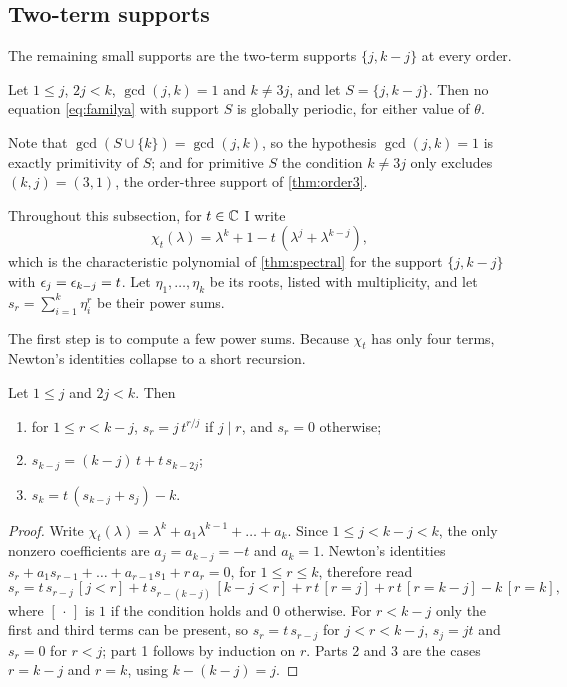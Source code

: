 \subsection{Two-term supports}

The remaining small supports are the two-term supports $\{j,k-j\}$ at
every order.

\begin{theorem}
\label{thm:twoterm}
Let $1\le j$, $2j<k$, $\gcd(j,k)=1$ and $k\ne3j$, and let $S=\{j,k-j\}$.
Then no equation \eqref{eq:familya} with support $S$ is globally periodic,
for either value of $\theta$.
\end{theorem}

Note that $\gcd(S\cup\{k\})=\gcd(j,k)$, so the hypothesis $\gcd(j,k)=1$ is
exactly primitivity of $S$; and for primitive $S$ the condition $k\ne3j$
only excludes $(k,j)=(3,1)$, the order-three support of
\autoref{thm:order3}.

Throughout this subsection, for $t\in\mathbb{C}$ I write
\begin{equation}
\chi_t(\lambda)=\lambda^k+1-t\,(\lambda^j+\lambda^{k-j}),
\end{equation}
which is the characteristic polynomial of \autoref{thm:spectral} for the
support $\{j,k-j\}$ with $\epsilon_j=\epsilon_{k-j}=t$. Let $\eta_1,\dots,\eta_k$
be its roots, listed with multiplicity, and let
$s_r=\sum_{i=1}^k\eta_i^r$ be their power sums.

The first step is to compute a few power sums. Because $\chi_t$ has only
four terms, Newton's identities collapse to a short recursion.

\begin{lemma}
\label{lem:small-newton}
Let $1\le j$ and $2j<k$. Then
\begin{enumerate}
\item for $1\le r<k-j$, $s_r=j\,t^{r/j}$ if $j\mid r$, and $s_r=0$
otherwise;
\item $s_{k-j}=(k-j)\,t+t\,s_{k-2j}$;
\item $s_k=t\,(s_{k-j}+s_j)-k$.
\end{enumerate}
\end{lemma}

\begin{proof}
Write $\chi_t(\lambda)=\lambda^k+a_1\lambda^{k-1}+\dots+a_k$. Since
$1\le j<k-j<k$, the only nonzero coefficients are $a_j=a_{k-j}=-t$ and
$a_k=1$. Newton's identities
$s_r+a_1s_{r-1}+\dots+a_{r-1}s_1+r\,a_r=0$, for $1\le r\le k$, therefore
read
\[
s_r=t\,s_{r-j}\,[j<r]+t\,s_{r-(k-j)}\,[k-j<r]
+r\,t\,[r=j]+r\,t\,[r=k-j]-k\,[r=k],
\]
where $[\,\cdot\,]$ is $1$ if the condition holds and $0$ otherwise. For
$r<k-j$ only the first and third terms can be present, so $s_r=t\,s_{r-j}$
for $j<r<k-j$, $s_j=jt$ and $s_r=0$ for $r<j$; part 1 follows by
induction on $r$. Parts 2 and 3 are the cases $r=k-j$ and $r=k$, using
$k-(k-j)=j$.
\end{proof}

